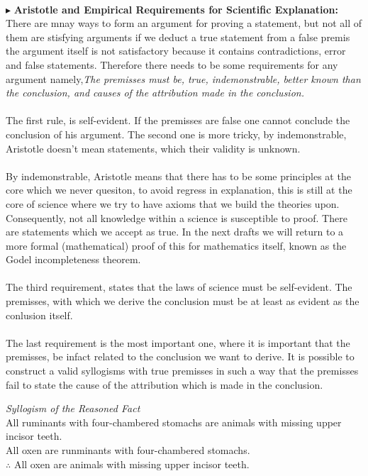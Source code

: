 \documentclass[9pt,a4paper,twocolumn]{article}
\newcounter{theo}
\newcommand{\newpoint}[1]{\indent$\blacktriangleright$ \textbf{#1}}
\begin{document}
            \\
            \newpoint{Aristotle and Empirical Requirements for Scientific Explanation:} There are mnay ways to form an argument for proving a statement, but not all of them are stisfying arguments if we deduct a true statement from a false premis the argument itself is not satisfactory because it contains contradictions, error and false statements. Therefore there needs to be some requirements for any argument namely,\textit{The premisses must be, true, indemonstrable, better known than the conclusion, and causes of the attribution made in the conclusion.}
            \\
            \\
            The first rule, is self-evident. If the premisses are false one cannot conclude the conclusion of his argument. The second one is more tricky, by indemonstrable, Aristotle doesn't mean statements, which their validity is unknown.
            \\
            \\
            By indemonstrable, Aristotle means that there has to be some principles at the core which we never quesiton, to avoid regress in explanation, this is still at the core of science where we try to have axioms that we build the theories upon. Consequently, not all knowledge within a science is susceptible to proof. There are statements which we accept as true. In the next drafts we will return to a more formal (mathematical) proof of this for mathematics itself, known as the Godel incompleteness theorem.
            \\
            \\
            The third requirement, states that the laws of science must be self-evident. The premisses, with which we derive the conclusion must be at least as evident as the conlusion itself.
            \\
            \\
            The last requirement is the most important one, where it is important that the premisses, be infact related to the conclusion we want to derive. It is possible to construct a valid syllogisms with true premisses in such a way that the premisses fail to state the cause of the attribution which is made in the conclusion.
            \begin{argue}
                \textit{Syllogism of the Reasoned Fact}\\
                All ruminants with four-chambered stomachs are animals with missing upper incisor teeth.
                \\
                All oxen are runminants with four-chambered stomachs.\\
                $\therefore$ All oxen are animals with missing upper incisor teeth.
            \end{argue}
\end{document}
